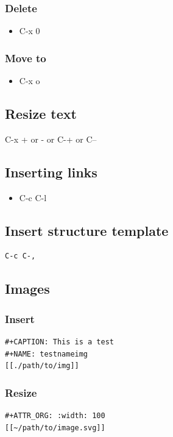 \documentclass[11pt]{article}
\begin{document}
\subsubsection*{Delete}
\label{sec:org7fb0843}
\begin{itemize}
\item C-x 0
\end{itemize}
\subsubsection*{Move to}
\label{sec:orga773829}
\begin{itemize}
\item C-x o
\end{itemize}
\subsection*{Resize text}
\label{sec:org3f4d8d0}
C-x + or - or C-+ or C--
\subsection*{Inserting links}
\label{sec:org347e16f}
\begin{itemize}
\item C-c C-l
\end{itemize}
\subsection*{Insert structure template}
\label{sec:orgf048ded}
\begin{verbatim}
C-c C-,
\end{verbatim}
\subsection*{Images}
\label{sec:org6ee02a7}
\subsubsection*{Insert}
\label{sec:orgad47b7d}
\begin{verbatim}
#+CAPTION: This is a test
#+NAME: testnameimg
[[./path/to/img]]
\end{verbatim}
\subsubsection*{Resize}
\label{sec:orgfe945ed}
\begin{verbatim}
#+ATTR_ORG: :width: 100
[[~/path/to/image.svg]]
\end{verbatim}
\end{document}
